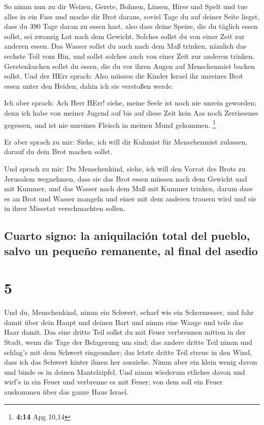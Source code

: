  So nimm nun zu dir Weizen, Gerste, Bohnen, Linsen, Hirse
und Spelt und tue alles in ein Fass und mache dir Brot daraus, soviel
Tage du auf deiner Seite liegst, dass du 390 Tage daran zu essen hast,
 also dass deine Speise, die du täglich essen sollst, sei
zwanzig Lot nach dem Gewicht. Solches sollst du von einer Zeit zur
anderen essen.  Das Wasser sollst du auch nach dem Maß
trinken, nämlich das sechste Teil vom Hin, und sollst solches auch von
einer Zeit zur anderen trinken.  Gerstenkuchen sollst du
essen, die du vor ihren Augen auf Menschenmist backen sollst.
 Und der HErr sprach: Also müssen die Kinder Israel ihr
unreines Brot essen unter den Heiden, dahin ich sie verstoßen werde.

 Ich aber sprach: Ach Herr HErr! siehe, meine Seele ist
noch nie unrein geworden; denn ich habe von meiner Jugend auf bis auf
diese Zeit kein Aas noch Zerrissenes gegessen, und ist nie unreines
Fleisch in meinen Mund gekommen. \footnote{\textbf{4:14} Apg 10,14}

 Er aber sprach zu mir: Siehe, ich will dir Kuhmist für
Menschenmist zulassen, darauf du dein Brot machen sollst.

 Und sprach zu mir: Du Menschenkind, siehe, ich will den
Vorrat des Brots zu Jerusalem wegnehmen, dass sie das Brot essen müssen
nach dem Gewicht und mit Kummer, und das Wasser nach dem Maß mit Kummer
trinken,  darum dass es an Brot und Wasser mangeln und
einer mit dem anderen trauern wird und sie in ihrer Missetat
verschmachten sollen.

\hypertarget{cuarto-signo-la-aniquilaciuxf3n-total-del-pueblo-salvo-un-pequeuxf1o-remanente-al-final-del-asedio}{%
\subsection{Cuarto signo: la aniquilación total del pueblo, salvo un
pequeño remanente, al final del
asedio}\label{cuarto-signo-la-aniquilaciuxf3n-total-del-pueblo-salvo-un-pequeuxf1o-remanente-al-final-del-asedio}}

\hypertarget{section-4}{%
\section{5}\label{section-4}}

 Und du, Menschenkind, nimm ein Schwert, scharf wie ein
Schermesser, und fahr damit über dein Haupt und deinen Bart und nimm
eine Waage und teile das Haar damit.  Das eine dritte Teil
sollst du mit Feuer verbrennen mitten in der Stadt, wenn die Tage der
Belagerung um sind; das andere dritte Teil nimm und schlag's mit dem
Schwert ringsumher; das letzte dritte Teil streue in den Wind, dass ich
das Schwert hinter ihnen her ausziehe.  Nimm aber ein
klein wenig davon und binde es in deinen Mantelzipfel. 
Und nimm wiederum etliches davon und wirf's in ein Feuer und verbrenne
es mit Feuer; von dem soll ein Feuer auskommen über das ganze Haus
Israel.

